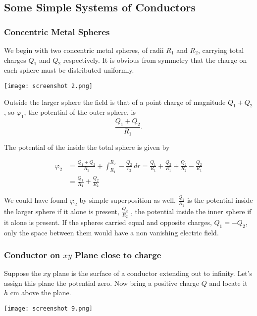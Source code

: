 \documentclass[svgnames]{article}
\begin{document}
\subsection{Some Simple Systems of Conductors}

\subsubsection{Concentric Metal Spheres} 

We begin with two concentric metal spheres, of radii $R_1$ and $R_2$, carrying
total charges $Q_1$ and $Q_2$ respectively. It is obvious from symmetry that
the charge on each sphere must be distributed uniformly. \\

\begin{center}
\texttt{[image: screenshot 2.png]}
\end{center}

Outside the larger sphere the field is that of a point charge of magnitude $Q_1
+ Q_2$, so $\varphi_1$, the potential of the outer sphere, is 
\[
\frac{Q_1+Q_2}{R_1}
.\] 

The potential of the inside the total sphere is given by 

\begin{align*}
  \varphi_2 &= \frac{Q_1+Q_2}{R_1} + \int_{R_1}^{R_2} -\frac{Q_2}{r_2} \, dr
= \frac{Q_1}{R_1} + \frac{Q_2}{R_1} + \frac{Q_2}{R_2} - \frac{Q_2}{R_1} \\
            & = \frac{Q_1}{R_1} + \frac{Q_2}{R_2}       
\end{align*}

We could have found $\varphi_2$ by simple superposition as well. $\frac{Q_1}{R_1}$
is the potential inside the larger sphere if it alone is present,
$\frac{Q_2}{R_2}$ , the potential inside the inner sphere if it alone is
present. If the spheres carried equal and opposite charges, $Q_1 = -Q_2$, only
the space between them would have a non vanishing electric field.

\subsubsection{Conductor on $xy$ Plane close to charge}

Suppose the $xy$ plane is the surface of a conductor extending out to infinity.
Let's assign this plane the potential zero. Now bring a positive charge $Q$ and
locate it $h$ cm above the plane. 


\begin{center}
\texttt{[image: screenshot 9.png]}
\end{center}
\end{document}
